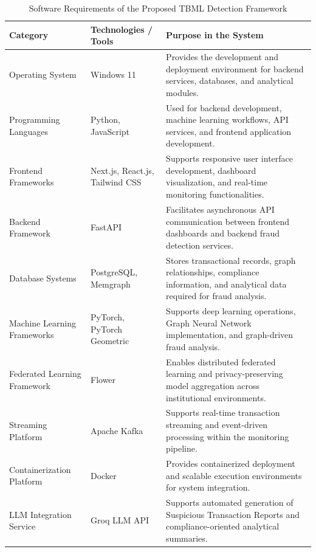 \begin{table}[H]

\caption{Software Requirements of the Proposed TBML Detection Framework}
\label{tab:software_requirements}

\vspace{0.2cm}

\centering

\begin{tabular}{|p{3.5cm}|p{4.2cm}|p{5.8cm}|}

\hline
\textbf{Category} & \textbf{Technologies / Tools} & \textbf{Purpose in the System} \\
\hline

Operating System 
& Windows 11 
& Provides the development and deployment environment for backend services, databases, and analytical modules. \\
\hline

Programming Languages 
& Python, JavaScript 
& Used for backend development, machine learning workflows, API services, and frontend application development. \\
\hline

Frontend Frameworks 
& Next.js, React.js, Tailwind CSS 
& Supports responsive user interface development, dashboard visualization, and real-time monitoring functionalities. \\
\hline

Backend Framework 
& FastAPI 
& Facilitates asynchronous API communication between frontend dashboards and backend fraud detection services. \\
\hline

Database Systems 
& PostgreSQL, Memgraph 
& Stores transactional records, graph relationships, compliance information, and analytical data required for fraud analysis. \\
\hline

Machine Learning Frameworks 
& PyTorch, PyTorch Geometric 
& Supports deep learning operations, Graph Neural Network implementation, and graph-driven fraud analysis. \\
\hline

Federated Learning Framework 
& Flower 
& Enables distributed federated learning and privacy-preserving model aggregation across institutional environments. \\
\hline

Streaming Platform 
& Apache Kafka 
& Supports real-time transaction streaming and event-driven processing within the monitoring pipeline. \\
\hline

Containerization Platform 
& Docker 
& Provides containerized deployment and scalable execution environments for system integration. \\
\hline

LLM Integration Service 
& Groq LLM API 
& Supports automated generation of Suspicious Transaction Reports and compliance-oriented analytical summaries. \\
\hline

\end{tabular}

\end{table}

